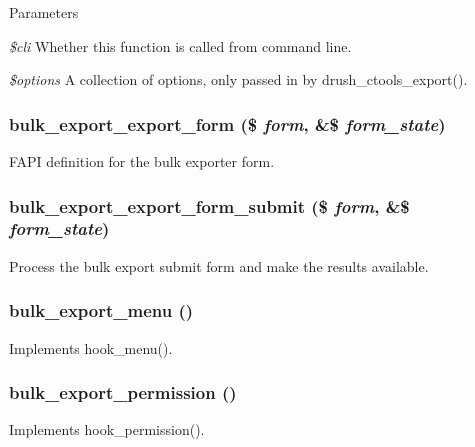 \begin{DoxyParams}{Parameters}
\item[{\em \$cli}]Whether this function is called from command line. \item[{\em \$options}]A collection of options, only passed in by drush\_\-ctools\_\-export(). \end{DoxyParams}
\hypertarget{bulk__export_8module_a8fbb895533c1a775e9c40a8dd335113c}{
\subsubsection[{bulk\_\-export\_\-export\_\-form}]{\setlength{\rightskip}{0pt plus 5cm}bulk\_\-export\_\-export\_\-form (\$ {\em form}, \/  \&\$ {\em form\_\-state})}}
\label{bulk__export_8module_a8fbb895533c1a775e9c40a8dd335113c}
FAPI definition for the bulk exporter form. \hypertarget{bulk__export_8module_a5737240f3ea826550894b474535c67a0}{
\subsubsection[{bulk\_\-export\_\-export\_\-form\_\-submit}]{\setlength{\rightskip}{0pt plus 5cm}bulk\_\-export\_\-export\_\-form\_\-submit (\$ {\em form}, \/  \&\$ {\em form\_\-state})}}
\label{bulk__export_8module_a5737240f3ea826550894b474535c67a0}
Process the bulk export submit form and make the results available. \hypertarget{bulk__export_8module_a7e9e45b8daed844ca0371fde54fa64d8}{
\subsubsection[{bulk\_\-export\_\-menu}]{\setlength{\rightskip}{0pt plus 5cm}bulk\_\-export\_\-menu ()}}
\label{bulk__export_8module_a7e9e45b8daed844ca0371fde54fa64d8}
Implements hook\_\-menu(). \hypertarget{bulk__export_8module_a2a73fe75148a7d87b162a95e6ece51fe}{
\subsubsection[{bulk\_\-export\_\-permission}]{\setlength{\rightskip}{0pt plus 5cm}bulk\_\-export\_\-permission ()}}
\label{bulk__export_8module_a2a73fe75148a7d87b162a95e6ece51fe}
Implements hook\_\-permission(). 